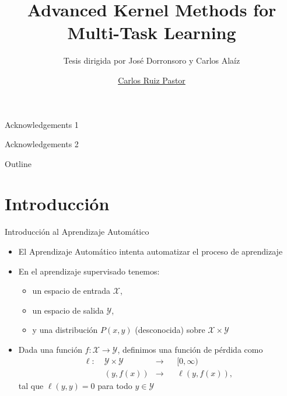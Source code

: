 \documentclass[aspectratio=43]{beamer}
\title{Advanced Kernel Methods for
Multi-Task Learning}
\subtitle{Tesis dirigida por José Dorronsoro y Carlos Alaíz}
\author{\href{mailto:carlos.ruizp@uam.es}{Carlos Ruiz Pastor}}
\newcommand{\lossf}{\ell}
\newcommand{\Xspace}{\mathcal{X}}
\newcommand{\Yspace}{\mathcal{Y}}
\begin{document}
\maketitle

\begin{frame}

Acknowledgements 1

\vspace{\baselineskip}

Acknowledgements 2

\end{frame}


\begin{frame}{Outline}{}
      \tableofcontents
\end{frame}

\section{Introducción}

\begin{frame}
      {Introducción al Aprendizaje Automático}

      \begin{itemize}
            \item El Aprendizaje Automático intenta automatizar el proceso de aprendizaje
            \item En el aprendizaje supervisado tenemos:
            \begin{itemize}
                  \item un espacio de entrada $\Xspace$,
                  \item un espacio de salida $\Yspace$,
                  \item y una distribución $P(x, y)$ (desconocida) sobre $\Xspace \times \Yspace$
            \end{itemize} 
            \item Dada una función $f: \Xspace \to \Yspace$, definimos una función de pérdida como
            \begin{equation}
                  \begin{aligned}
              \nonumber
              \lossf:\; &\Yspace \times \Yspace &\to &&[0, \infty) \\
              &(y, f(x)) &\to  && \lossf(y, f(x)) ,
          \end{aligned}
          \end{equation}
          tal que $\lossf(y, y) = 0$ para todo $y \in \Yspace$
            
      \end{itemize}
      
\end{frame}
\end{document}
